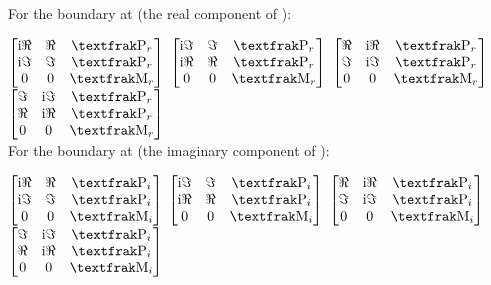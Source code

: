 \documentclass[]{iucr}              %
\numberwithin{equation}{section}
\begin{document}
For the boundary at \siii{} (the real component of \ciii{}):

$\begin{bmatrix}

\textrm{i}\Re{} & \Re{} & \Plus{}_r \\
\textrm{i}\Im{} & \Im{}& \Plus{}_r  \\
0 & 0& \Minus{}_r  \\
\end{bmatrix}$
%
$\begin{bmatrix}
\textrm{i}\Im{} &  \Im{} & \Plus{}_r \\
\textrm{i}\Re{} & \Re{} & \Plus{}_r \\
0 & 0 & \Minus{}_r \\
\end{bmatrix}$ 
%
$\begin{bmatrix}
\Re{} &   \textrm{i}\Re{} &\Plus{}_r \\
\Im{} & \textrm{i}\Im{}&\Plus{}_r \\
0  &  0 & \Minus{}_r \\
\end{bmatrix}	$ 
%
$\begin{bmatrix}
\Im{} & \textrm{i}\Im{} & \Plus{}_r \\
\Re{} &  \textrm{i}\Re{} & \Plus{}_r \\
0 &  0 &\Minus{}_r \\
\end{bmatrix}$ \\


For the boundary at \svi{} (the imaginary component of \ciii{}):

$\begin{bmatrix}

\textrm{i}\Re{} & \Re{} & \Plus{}_i \\
\textrm{i}\Im{} & \Im{}& \Plus{}_i \\
0 & 0 & \Minus{}_i 
\end{bmatrix}$
%
$\begin{bmatrix}
\textrm{i}\Im{} &  \Im{} & \Plus{}_i \\
\textrm{i}\Re{} & \Re{} & \Plus{}_i \\
0 & 0 & \Minus{}_i \\
\end{bmatrix}$ 
%
$\begin{bmatrix}
\Re{} &   \textrm{i}\Re{}  &\Plus{}_i \\
\Im{} & \textrm{i}\Im{} &\Plus{}_i \\
0 &  0 & \Minus{}_i \\
\end{bmatrix}	$ 
%
$\begin{bmatrix}
\Im{} & \textrm{i}\Im{} & \Plus{}_i \\
\Re{} &  \textrm{i}\Re{} & \Plus{}_i \\
0 &  0 &\Minus{}_i 
\end{bmatrix}$ \\
\end{document}
